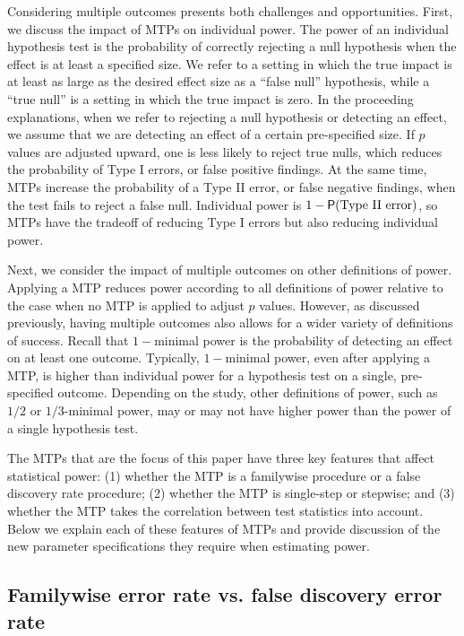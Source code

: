 \documentclass[
]{jss}
\begin{document}
Considering multiple outcomes presents both challenges and
opportunities. First, we discuss the impact of MTPs on individual power.
The power of an individual hypothesis test is the probability of
correctly rejecting a null hypothesis when the effect is at least a
specified size. We refer to a setting in which the true impact is at
least as large as the desired effect size as a ``false null''
hypothesis, while a ``true null'' is a setting in which the true impact
is zero. In the proceeding explanations, when we refer to rejecting a
null hypothesis or detecting an effect, we assume that we are detecting
an effect of a certain pre-specified size. If \(p\) values are adjusted
upward, one is less likely to reject true nulls, which reduces the
probability of Type I errors, or false positive findings. At the same
time, MTPs increase the probability of a Type II error, or false
negative findings, when the test fails to reject a false null.
Individual power is \(1 - \mathsf{P}(\text{Type II error})\), so MTPs have
the tradeoff of reducing Type I errors but also reducing individual
power.

Next, we consider the impact of multiple outcomes on other definitions
of power. Applying a MTP reduces power according to all definitions of
power relative to the case when no MTP is applied to adjust \(p\)
values. However, as discussed previously, having multiple outcomes also
allows for a wider variety of definitions of success. Recall that
\(1-\)minimal power is the probability of detecting an effect on at
least one outcome. Typically, \(1-\)minimal power, even after applying a
MTP, is higher than individual power for a hypothesis test on a single,
pre-specified outcome. Depending on the study, other definitions of
power, such as \(1/2\) or \(1/3\)-minimal power, may or may not have
higher power than the power of a single hypothesis test.

The MTPs that are the focus of this paper have three key features that
affect statistical power: (1) whether the MTP is a familywise procedure
or a false discovery rate procedure; (2) whether the MTP is single-step
or stepwise; and (3) whether the MTP takes the correlation between test
statistics into account. Below we explain each of these features of MTPs
and provide discussion of the new parameter specifications they require
when estimating power.

\subsection{Familywise error rate vs. false discovery error rate}
\end{document}
